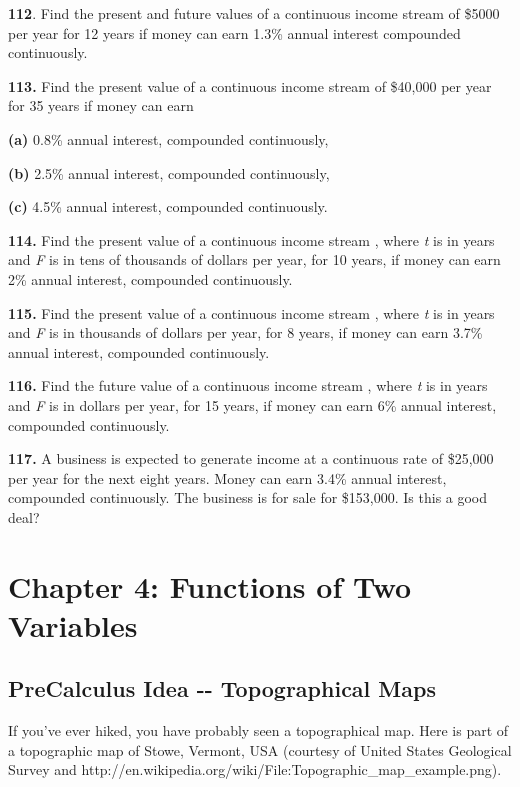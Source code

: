 \textbf{112}. Find the present and future values of a continuous income
stream of \$5000 per year for 12 years if money can earn 1.3\% annual
interest compounded continuously.

\textbf{113.} Find the present value of a continuous income stream of
\$40,000 per year for 35 years if money can earn

\textbf{(a)} 0.8\% annual interest, compounded continuously,

\textbf{(b)} 2.5\% annual interest, compounded continuously,

\textbf{(c)} 4.5\% annual interest, compounded continuously.

\textbf{114.} Find the present value of a continuous income stream ,
where \emph{t} is in years and \emph{F} is in tens of thousands of
dollars per year, for 10 years, if money can earn 2\% annual interest,
compounded continuously.

\textbf{115.} Find the present value of a continuous income stream ,
where \emph{t} is in years and \emph{F} is in thousands of dollars per
year, for 8 years, if money can earn 3.7\% annual interest, compounded
continuously.

\textbf{116.} Find the future value of a continuous income stream ,
where \emph{t} is in years and \emph{F} is in dollars per year, for 15
years, if money can earn 6\% annual interest, compounded continuously.

\textbf{117.} A business is expected to generate income at a continuous
rate of \$25,000 per year for the next eight years. Money can earn 3.4\%
annual interest, compounded continuously. The business is for sale for
\$153,000. Is this a good deal?

\hypertarget{chapter-4-functions-of-two-variables}{\section{Chapter 4:
Functions of Two Variables}\label{chapter-4-functions-of-two-variables}}

\hypertarget{precalculus-idea----topographical-maps}{\subsection{PreCalculus
Idea -\/- Topographical
Maps}\label{precalculus-idea----topographical-maps}}

If you've ever hiked, you have probably seen a topographical map. Here
is part of a topographic map of Stowe, Vermont, USA (courtesy of United
States Geological Survey and
http://en.wikipedia.org/wiki/File:Topographic\_map\_example.png).

